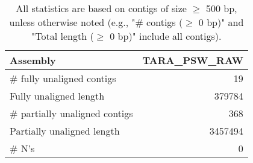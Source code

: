 \documentclass[12pt,a4paper]{article}
\begin{document}
\begin{table}[ht]
\begin{center}
\caption{All statistics are based on contigs of size $\geq$ 500 bp, unless otherwise noted (e.g., "\# contigs ($\geq$ 0 bp)" and "Total length ($\geq$ 0 bp)" include all contigs).}
\begin{tabular}{|l*{1}{|r}|}
\hline
Assembly & TARA\_PSW\_RAW \\ \hline
\# fully unaligned contigs & 19 \\ \hline
Fully unaligned length & 379784 \\ \hline
\# partially unaligned contigs & 368 \\ \hline
Partially unaligned length & 3457494 \\ \hline
\# N's & 0 \\ \hline
\end{tabular}
\end{center}
\end{table}
\end{document}
